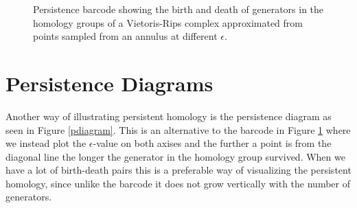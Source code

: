 \begin{figure}
\caption{\label{annulus_barcode} Persistence barcode showing the birth and death of generators in the homology groups of a Vietoris-Rips complex approximated from points sampled from an annulus at different $\epsilon$. }
\end{figure}
  \section{Persistence Diagrams}
  Another way of illustrating persistent homology is the persistence diagram as seen in Figure \ref{pdiagram}. This is an alternative to the barcode in Figure \ref{annulus_barcode} where we instead plot the $\epsilon$-value on both axises and the further a point is from the diagonal line the longer the generator in the homology group survived. When we have a lot of birth-death pairs this is a preferable way of visualizing the persistent homology, since unlike the barcode it does not grow vertically with the number of generators.

